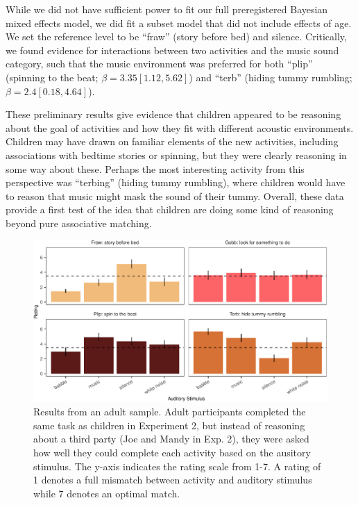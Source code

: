 \documentclass[10pt, letterpaper]{article}
\newenvironment{CodeChunk}{}{}
\begin{document}
While we did not have sufficient power to fit our full preregistered
Bayesian mixed effects model, we did fit a subset model that did not
include effects of age. We set the reference level to be ``fraw'' (story
before bed) and silence. Critically, we found evidence for interactions
between two activities and the music sound category, such that the music
environment was preferred for both ``plip'' (spinning to the beat;
\(\beta = 3.35 [1.12, 5.62]\)) and ``terb'' (hiding tummy rumbling;
\(\beta = 2.4 [0.18, 4.64]\)).

These preliminary results give evidence that children appeared to be
reasoning about the goal of activities and how they fit with different
acoustic environments. Children may have drawn on familiar elements of
the new activities, including associations with bedtime stories or
spinning, but they were clearly reasoning in some way about these.
Perhaps the most interesting activity from this perspective was
``terbing'' (hiding tummy rumbling), where children would have to reason
that music might mask the sound of their tummy. Overall, these data
provide a first test of the idea that children are doing some kind of
reasoning beyond pure associative matching.

\begin{CodeChunk}
\begin{figure}[t]

{\centering \includegraphics{figs/e4a-bar-1} 

}

\caption[Results from an adult sample]{Results from an adult sample. Adult participants completed the same task as children in Experiment 2, but instead of reasoning about a third party (Joe and Mandy in Exp. 2), they were asked how well they could complete each activity based on the ausitory stimulus. The y-axis indicates the rating scale from 1-7. A rating of 1 denotes a full mismatch between activity and auditory stimulus while 7 denotes an optimal match.}\label{fig:e4a-bar}
\end{figure}
\end{CodeChunk}
\end{document}
